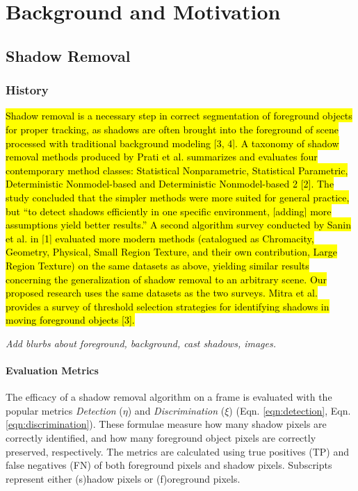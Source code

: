 \documentclass[12pt]{report}
\begin{document}
\doublespacing

\clearpage
\chapter{Background and Motivation}

\section{Shadow Removal}

\subsection{History}

\hl{Shadow removal is a necessary step in correct segmentation of foreground objects for proper tracking, as shadows are often brought into the foreground of scene processed with traditional background modeling [3, 4]. A taxonomy of shadow removal methods produced by Prati et al. summarizes and evaluates four contemporary method classes: Statistical Nonparametric, Statistical Parametric, Deterministic Nonmodel-based and Deterministic Nonmodel-based 2 [2]. The study concluded that the simpler methods were more suited for general practice, but “to detect shadows efficiently in one specific environment, [adding] more assumptions yield better results.” A second algorithm survey conducted by Sanin et al. in [1] evaluated more modern methods (catalogued as Chromacity, Geometry, Physical, Small Region Texture, and their own contribution, Large Region Texture) on the same datasets as above, yielding similar results concerning the generalization of shadow removal to an arbitrary scene. Our proposed research uses the same datasets as the two surveys. Mitra et al. provides a survey of threshold selection strategies for identifying shadows in moving foreground objects [3].}

\textit{Add blurbs about foreground, background, cast shadows, images.}

\subsubsection{Evaluation Metrics}

The efficacy of a shadow removal algorithm on a frame is evaluated with the popular metrics \textit{Detection} ($\eta$) and \textit{Discrimination} ($\xi$) (Eqn. \ref{eqn:detection}, Eqn. \ref{eqn:discrimination}). These formulae measure how many shadow pixels are correctly identified, and how many foreground object pixels are correctly preserved, respectively. The metrics are calculated using true positives (TP) and false negatives (FN) of both foreground pixels and shadow pixels. Subscripts represent either (s)hadow pixels or (f)oreground pixels.
\end{document}

